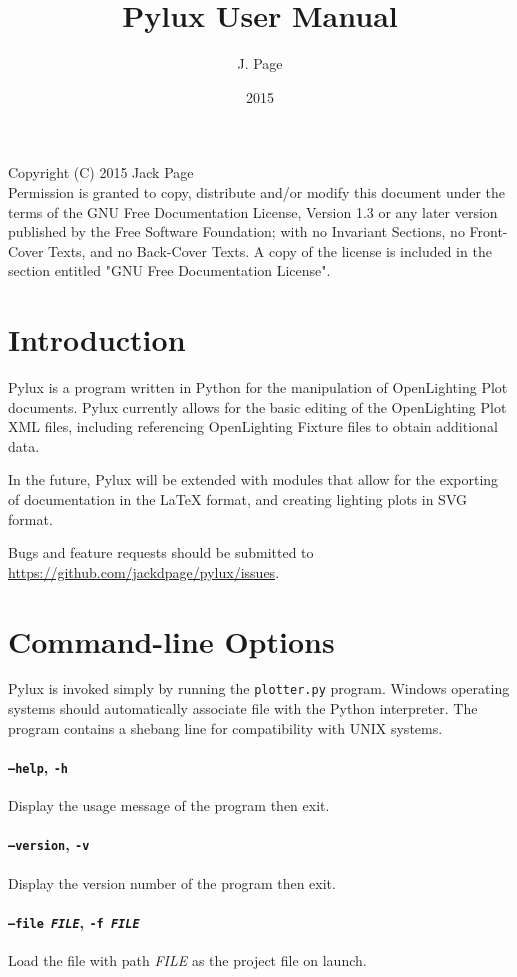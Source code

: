 \documentclass[a4paper]{article}
\begin{document}
\title{Pylux User Manual}
\author{J. Page}
\date{2015}
\maketitle
\newpage
Copyright (C)  2015 Jack Page \\
Permission is granted to copy, distribute and/or modify this document
under the terms of the GNU Free Documentation License, Version 1.3
or any later version published by the Free Software Foundation;
with no Invariant Sections, no Front-Cover Texts, and no Back-Cover Texts.
A copy of the license is included in the section entitled "GNU
Free Documentation License".
\newpage
\tableofcontents
\newpage
\section{Introduction}
Pylux is a program written in Python for the manipulation of OpenLighting Plot
documents. Pylux currently allows for the basic editing of the OpenLighting
Plot XML files, including referencing OpenLighting Fixture files to obtain
additional data.

In the future, Pylux will be extended with modules that allow for the exporting
of documentation in the \LaTeX{} format, and creating lighting plots in SVG 
format.

Bugs and feature requests should be submitted to 
\url{https://github.com/jackdpage/pylux/issues}.

\section{Command-line Options}
Pylux is invoked simply by running the \texttt{plotter.py} program. Windows 
operating systems should automatically associate file with the Python 
interpreter. The program contains a shebang line for compatibility with UNIX
systems. 

\paragraph{\texttt{--help}, \texttt{-h}}
Display the usage message of the program then exit.

\paragraph{\texttt{--version}, \texttt{-v}}
Display the version number of the program then exit.

\paragraph{\texttt{--file \textit{FILE}}, \texttt{-f \textit{FILE}}} 
Load the file with path \textit{FILE} as the project file on launch.
\end{document}
